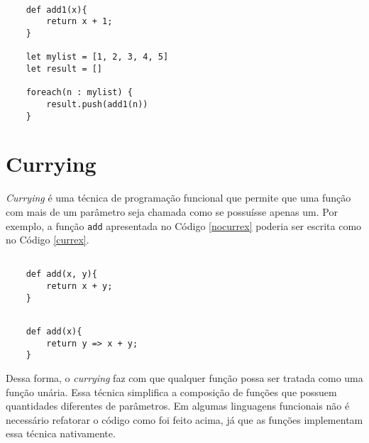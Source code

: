 \begin{lstlisting}[caption={Exemplo sem Funções de Alta Ordem.},label=nohof]

    def add1(x){
        return x + 1;
    }

    let mylist = [1, 2, 3, 4, 5]
    let result = []

    foreach(n : mylist) {
        result.push(add1(n))
    }

\end{lstlisting}

\begin{comment}
Talvez a implementação da função map seja parecida 
com a função acima, porém, um programador que não 
conhece o programa levaria muito menos tempo para 
entender a primeira implementação do que a segunda. 
Além disso, para cada função diferente que poderia 
ser aplicada a essa mesma coleção, a mesma 
implementação teria que ser repetida.
\end{comment}



\section{Currying}

\textit{Currying} é uma técnica de programação funcional que 
permite que uma função com mais de um parâmetro seja 
chamada como se possuísse apenas um\cite{realworldhaskell, functionalscala}. 
Por exemplo, a função \texttt{add} apresentada no Código 
\ref{nocurrex} poderia ser escrita como no Código 
\ref{currex}.

\begin{lstlisting}[caption={Exemplo sem \textit{Currying}.},label=nocurrex]

    def add(x, y){
        return x + y;
    }

\end{lstlisting}

\begin{lstlisting}[caption={Exemplo de \textit{Currying}.},label=currex]

    def add(x){
        return y => x + y;
    }

\end{lstlisting}

Dessa forma, o \textit{currying} faz com que qualquer 
função possa ser tratada como uma função unária. 
Essa técnica simplifica a composição de funções 
que possuem quantidades diferentes de parâmetros. 
Em algumas linguagens funcionais não é 
necessário refatorar o código como foi feito 
acima, já que as funções implementam essa técnica 
nativamente\cite{realworldhaskell}.


